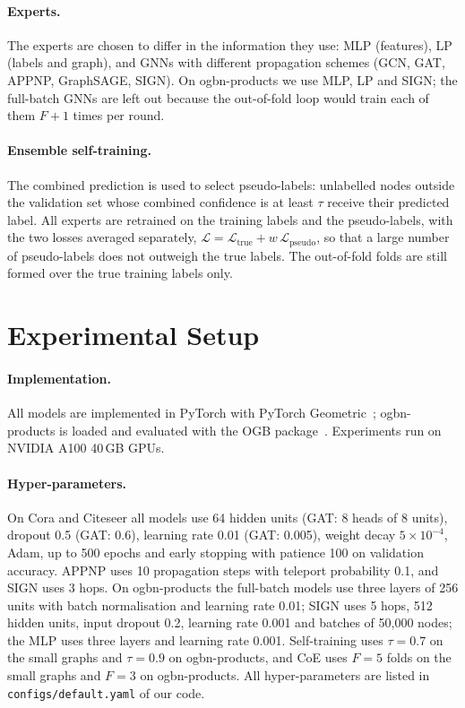 \documentclass[sigconf,nonacm]{acmart}
\begin{document}
\paragraph{Experts.}
The experts are chosen to differ in the information they use: MLP (features), LP (labels and graph), and GNNs with different propagation schemes (GCN, GAT, APPNP, GraphSAGE, SIGN).
On ogbn-products we use MLP, LP and SIGN; the full-batch GNNs are left out because the out-of-fold loop would train each of them $F+1$ times per round.

\paragraph{Ensemble self-training.}
The combined prediction is used to select pseudo-labels: unlabelled nodes outside the validation set whose combined confidence is at least $\tau$ receive their predicted label.
All experts are retrained on the training labels and the pseudo-labels, with the two losses averaged separately, $\mathcal{L}=\mathcal{L}_{\text{true}}+w\,\mathcal{L}_{\text{pseudo}}$, so that a large number of pseudo-labels does not outweigh the true labels.
The out-of-fold folds are still formed over the true training labels only.

\section{Experimental Setup}

\paragraph{Implementation.}
All models are implemented in PyTorch with PyTorch Geometric~\cite{fey2019pyg}; ogbn-products is loaded and evaluated with the OGB package~\cite{hu2020ogb}.
Experiments run on NVIDIA A100 40\,GB GPUs.

\paragraph{Hyper-parameters.}
On Cora and Citeseer all models use 64 hidden units (GAT: 8 heads of 8 units), dropout 0.5 (GAT: 0.6), learning rate 0.01 (GAT: 0.005), weight decay $5\times10^{-4}$, Adam, up to 500 epochs and early stopping with patience 100 on validation accuracy.
APPNP uses 10 propagation steps with teleport probability 0.1, and SIGN uses 3 hops.
On ogbn-products the full-batch models use three layers of 256 units with batch normalisation and learning rate 0.01; SIGN uses 5 hops, 512 hidden units, input dropout 0.2, learning rate 0.001 and batches of 50{,}000 nodes; the MLP uses three layers and learning rate 0.001.
Self-training uses $\tau=0.7$ on the small graphs and $\tau=0.9$ on ogbn-products, and CoE uses $F=5$ folds on the small graphs and $F=3$ on ogbn-products.
All hyper-parameters are listed in \texttt{configs/default.yaml} of our code.
\end{document}
